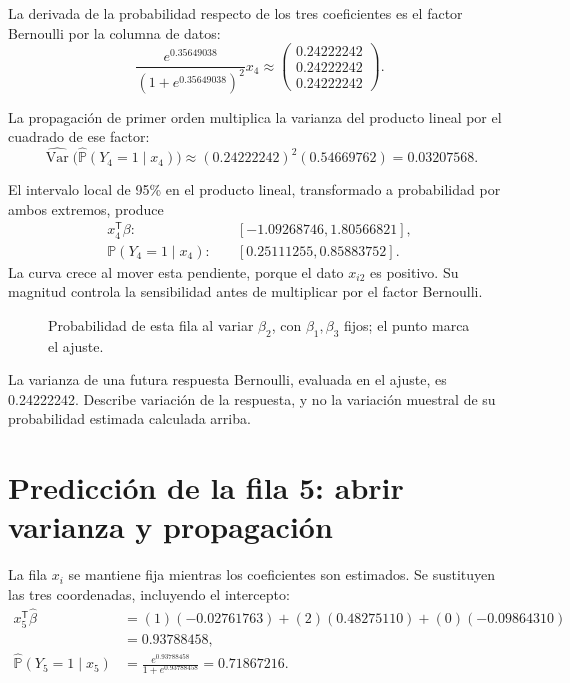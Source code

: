 \documentclass[11pt,a4paper]{article}
\newcommand{\Prob}{\mathbb P}
\newcommand{\T}{^{\mathsf T}}
\DeclareMathOperator{\Var}{Var}
\begin{document}
La derivada de la probabilidad respecto de los tres coeficientes
es el factor Bernoulli por la columna de datos:
\[
\frac{e^{0.35649038}}{(1+e^{0.35649038})^2}x_{4}\approx\begin{pmatrix}0.24222242\\0.24222242\\0.24222242\end{pmatrix}.
\]

La propagación de primer orden multiplica la varianza del
producto lineal por el cuadrado de ese factor:
\[
\widehat{\Var}\bigl(\widehat{\Prob}(Y_{4}=1\mid x_{4})\bigr)\approx(0.24222242)^2(0.54669762)=0.03207568.
\]

El intervalo local de 95\% en el producto lineal,
transformado a probabilidad por ambos extremos, produce
\[
\begin{aligned}
x_{4}\T\beta:&\quad[-1.09268746,1.80566821],\\\Prob(Y_{4}=1\mid x_{4}):&\quad[0.25111255,0.85883752].\end{aligned}
\]
La curva crece al mover esta pendiente, porque el dato $x_{i2}$ es positivo. Su magnitud controla la sensibilidad antes de multiplicar por el factor Bernoulli.
\begin{figure}[H]\centering
{}
\caption{Probabilidad de esta fila al variar \(\beta_2\), con \(\beta_1,\beta_3\) fijos; el punto marca el ajuste.}
\end{figure}

La varianza de una futura respuesta Bernoulli,
evaluada en el ajuste, es 0.24222242.
Describe variación de la respuesta, y no la variación
muestral de su probabilidad estimada calculada arriba.
\endgroup

\clearpage
\section{Predicción de la fila 5: abrir varianza y propagación}\label{logit114}
\begingroup\small
\setlength{\abovedisplayskip}{4pt}\setlength{\belowdisplayskip}{4pt}
La fila \(x_i\) se mantiene fija mientras los coeficientes
son estimados. Se sustituyen las tres coordenadas,
incluyendo el intercepto:
\[
\begin{aligned}
x_{5}\T\widehat\beta&=(1)(-0.02761763)+(2)(0.48275110)+(0)(-0.09864310)\\&=0.93788458,\\\widehat{\Prob}(Y_{5}=1\mid x_{5})&=\frac{e^{0.93788458}}{1+e^{0.93788458}}=0.71867216.\end{aligned}
\]
\end{document}
